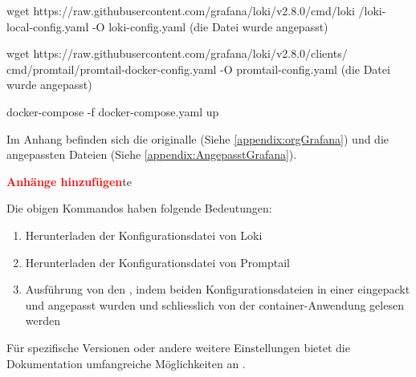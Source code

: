 {
\begin{spverbatim}
wget https://raw.githubusercontent.com/grafana/loki/v2.8.0/cmd/loki
/loki-local-config.yaml -O loki-config.yaml (die Datei wurde angepasst)

wget https://raw.githubusercontent.com/grafana/loki/v2.8.0/clients/
cmd/promtail/promtail-docker-config.yaml -O promtail-config.yaml 
(die Datei wurde angepasst)

docker-compose -f docker-compose.yaml up 
\end{spverbatim}
}


Im Anhang befinden sich die originalle (Siehe \ref{appendix:orgGrafana}) und die angepassten Dateien (Siehe \ref{appendix:AngepasstGrafana}).

\textcolor{red}{\textbf{Anhänge hinzufügen}}te

Die obigen Kommandos haben folgende Bedeutungen:
\begin{enumerate}[noitemsep]
   \item Herunterladen der Konfigurationsdatei von Loki
   \item Herunterladen der Konfigurationsdatei von Promptail
   \item Ausführung von den , indem beiden Konfigurationsdateien in einer eingepackt und angepasst wurden und schliesslich von der \gls{container}-Anwendung gelesen werden
\end{enumerate}

Für spezifische Versionen oder andere weitere Einstellungen bietet die Dokumentation umfangreiche Möglichkeiten an \citep{GrafanaLoki_run}.

